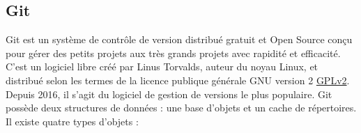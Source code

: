 \subsection{Git}

Git est un système de contrôle de version distribué gratuit et Open Source conçu pour gérer des
petits projets aux très grands projets avec rapidité et efficacité. C'est un logiciel libre créé par
Linus Torvalds, auteur du noyau Linux, et distribué selon les termes de la licence publique
générale GNU version 2 \href{https://edu.casio.com/support/fr/gplv2.html}{GPLv2}. Depuis 2016, il s’agit du logiciel de gestion de versions le
plus populaire. Git possède deux structures de données : une base d'objets et un cache de
répertoires. Il existe quatre types d'objets :
